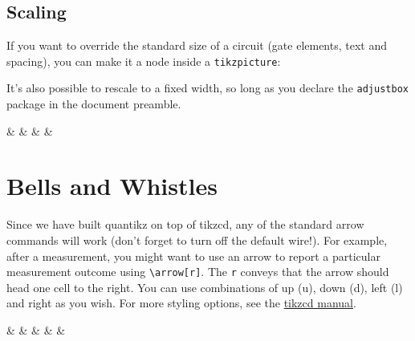 \documentclass[aps,pra,10pt,nofootinbib]{revtex4-2}
\begin{document}

\subsection{Scaling}

If you want to override the standard size of a circuit (gate elements, text and spacing), you can make it a node inside a \verb!tikzpicture!:
\begin{Code}
\end{Code}
It's also possible to rescale to a fixed width, so long as you declare the \verb!adjustbox! package in the document preamble.
\begin{Code}
\begin{adjustbox}{width=0.8\textwidth}
\begin{quantikz}
&  & \phase{\beta} &  &
\end{quantikz}
\end{adjustbox}
\end{Code}

\section{Bells and Whistles}

Since we have built quantikz on top of tikzcd, any of the standard arrow commands will work (don't forget to turn off the default wire!). For example, after a measurement, you might want to use an arrow to report a particular measurement outcome using \verb!\arrow[r]!. The \verb!r! conveys that the arrow should head one cell to the right. You can use combinations of up (u), down (d), left (l) and right as you wish. For more styling options, see the \href{http://mirrors.ctan.org/graphics/pgf/contrib/tikz-cd/tikz-cd-doc.pdf}{tikzcd manual}.
\begin{Code}
\begin{quantikz}
 & &  & &  \arrow[r] & 
\end{quantikz}
\end{Code}
\end{document}
